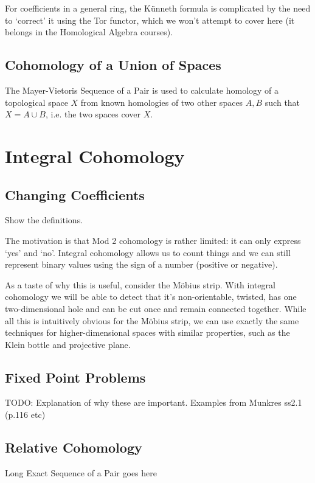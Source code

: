 \documentclass[oneside,english]{amsbook}
\numberwithin{section}{chapter}
\theoremstyle{plain}
\theoremstyle{definition}
\providecommand{\Kunneth}{K{\"u}nneth }
\begin{document}
 	For coefficients in a general ring, the \Kunneth formula is complicated by the need to `correct' it using the Tor functor, which we won't attempt to cover here (it belongs in the Homological Algebra courses).
	
	\section{Cohomology of a Union of Spaces}
	The Mayer-Vietoris Sequence of a Pair is used to calculate homology of a topological space $X$ from known homologies of two other spaces $A, B$ such that $X = A\cup B$, i.e. the two spaces cover $X$.


	\chapter{Integral Cohomology}
	
	\section{Changing Coefficients}
	
	Show the definitions.
	
	The motivation is that Mod 2 cohomology is rather limited: it can only express `yes' and `no'. Integral cohomology allows us to count things and we can still represent binary values using the sign of a number (positive or negative).
	
	As a taste of why this is useful, consider the M\"obius strip. With integral cohomology we will be able to detect that it's non-orientable, twisted, has one two-dimensional hole and can be cut once and remain connected together. While all this is intuitively obvious for the M\"obius strip, we can use exactly the same techniques for higher-dimensional spaces with similar properties, such as the Klein bottle and projective plane.

	\section{Fixed Point Problems}
	
	TODO: Explanation of why these are important. Examples from Munkres ss2.1 (p.116 etc)

	\section{Relative Cohomology}
	
	Long Exact Sequence of a Pair goes here
	
\end{document}
